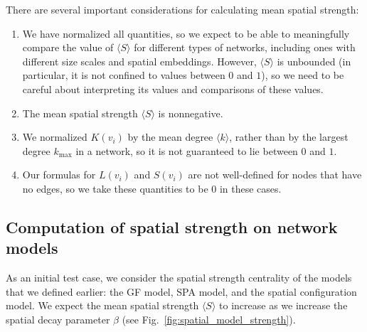 \documentclass[%
 reprint,
 amsmath,amssymb,
 aps,
]{revtex4-1}
\begin{document}
%
%


There are several important considerations for calculating mean spatial strength:
\begin{enumerate}
    \item We have normalized all quantities, so we expect to be able to meaningfully compare the value of $\langle S \rangle$ for different types of networks, including ones with different size scales and spatial embeddings. However, $\langle S \rangle$ is unbounded (in particular, it is not confined to values between $0$ and $1$), so we need to be careful about interpreting its values and comparisons of these values.
    \item The mean spatial strength $\langle S \rangle$ is nonnegative.
    \item We normalized $K(v_i)$ by the mean degree $\langle k \rangle$, rather than by the largest degree $k_{\mathrm{max}}$ in a network, so it is not guaranteed to lie between $0$ and $1$.
    \item Our formulas for $L(v_i)$ and $S(v_i)$ are not well-defined for nodes that have no edges, so we take these quantities to be $0$ in these cases.
\end{enumerate}


\subsection{Computation of spatial strength on network models}\label{sec:computed_ss}

As an initial test case, we consider the spatial strength centrality of the models that we defined earlier: the GF model, SPA model, and the spatial configuration model. We expect the mean spatial strength $\langle S \rangle$ to increase as we increase the spatial decay parameter $\beta$ (see Fig.~\ref{fig:spatial_model_strength}).
\end{document}
